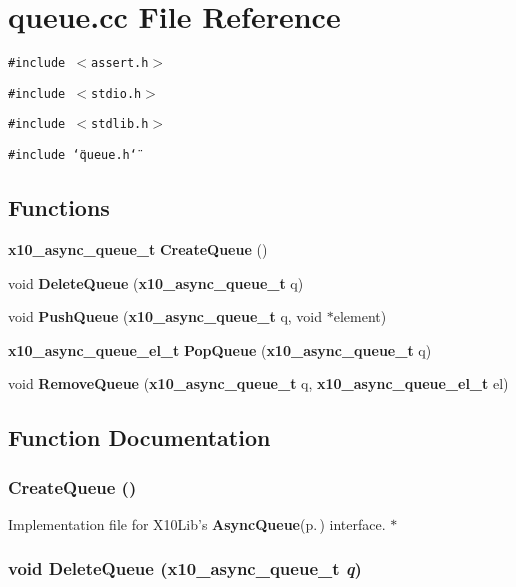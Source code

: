 \section{queue.cc File Reference}
\label{queue_8cc}
{\tt \#include $<$assert.h$>$}\par
{\tt \#include $<$stdio.h$>$}\par
{\tt \#include $<$stdlib.h$>$}\par
{\tt \#include \char`\"{}queue.h\char`\"{}}\par
\subsection*{Functions}
\begin{CompactItemize}
\item 
{\bf x10\_\-async\_\-queue\_\-t} {\bf Create\-Queue} ()
\item 
void {\bf Delete\-Queue} ({\bf x10\_\-async\_\-queue\_\-t} q)
\item 
void {\bf Push\-Queue} ({\bf x10\_\-async\_\-queue\_\-t} q, void $\ast$element)
\item 
{\bf x10\_\-async\_\-queue\_\-el\_\-t} {\bf Pop\-Queue} ({\bf x10\_\-async\_\-queue\_\-t} q)
\item 
void {\bf Remove\-Queue} ({\bf x10\_\-async\_\-queue\_\-t} q, {\bf x10\_\-async\_\-queue\_\-el\_\-t} el)
\end{CompactItemize}


\subsection{Function Documentation}
\subsubsection{ Create\-Queue ()}\label{queue_8cc_a0}


Implementation file for X10Lib's {\bf Async\-Queue}{\rm (p.\,\pageref{structAsyncQueue})} interface. $\ast$ 
\subsubsection{\setlength{\rightskip}{0pt plus 5cm}void Delete\-Queue ({\bf x10\_\-async\_\-queue\_\-t} {\em q})}\label{queue_8cc_a1}


